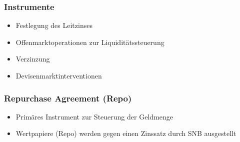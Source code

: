 \subsubsection{Instrumente}
\begin{itemize}
    \item Festlegung des Leitzinses
    \item Offenmarktoperationen zur Liquiditätssteuerung
    \item Verzinzung 
    \item Devisenmarktinterventionen
\end{itemize}

\subsubsection{Repurchase Agreement (Repo)}
\begin{itemize}
    \item Primäres Instrument zur Steuerung der Geldmenge
    \item Wertpapiere (Repo) werden gegen einen Zinssatz durch SNB ausgestellt
\end{itemize}


